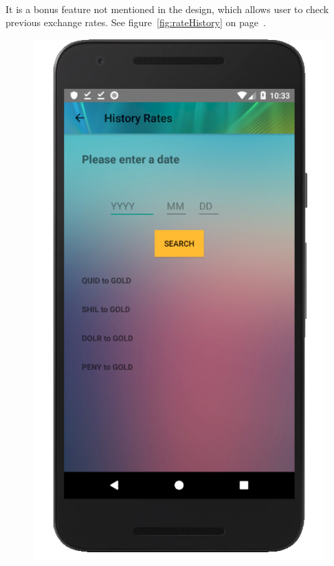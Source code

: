 \documentclass[12pt]{article}
\begin{document}
\paragraph{}
It is a bonus feature not mentioned in the design, which allows user to check previous exchange rates. See figure~\ref{fig:rateHistory} on page~\pageref{fig:rateHistory}.
\begin{figure}
	\centering
	\includegraphics[scale=0.25]{HistoryRate.png}

\end{figure}
\end{document}

